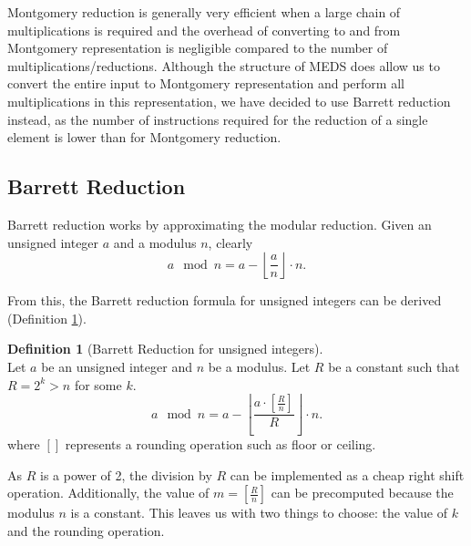 \documentclass[11pt,a4paper]{report}
\theoremstyle{definition}
\newtheorem{definition}{Definition}[section]
\begin{document}
Montgomery reduction is generally very efficient when a large chain of multiplications is required and the overhead of converting to and from Montgomery representation is negligible compared to the number of multiplications/reductions. Although the structure of MEDS does allow us to convert the entire input to Montgomery representation and perform all multiplications in this representation, we have decided to use Barrett reduction instead, as the number of instructions required for the reduction of a single element is lower than for Montgomery reduction.

\subsection{Barrett Reduction}
\label{sec:barrettreduction}
Barrett reduction works by approximating the modular reduction. Given an unsigned integer $a$ and a modulus $n$, clearly
\[
  a \mod n = a - \left\lfloor \frac{a}{n} \right\rfloor \cdot n.
\]

From this, the Barrett reduction formula for unsigned integers can be derived (Definition \ref{def:barrettreduction}).

\begin{definition}[Barrett Reduction for unsigned integers]~\\
  \label{def:barrettreduction}
  Let $a$ be an unsigned integer and $n$ be a modulus.
  Let $R$ be a constant such that $R = 2^k > n$ for some $k$.
  \[
    a \mod n = a - \left\lfloor \frac{a \cdot \left[\frac{R}{n}\right]}{R} \right\rfloor \cdot n.
  \]
  where $\left[\right]$ represents a rounding operation such as floor or ceiling.
\end{definition}

As $R$ is a power of 2, the division by $R$ can be implemented as a cheap right shift operation. Additionally, the value of $m = \left[\frac{R}{n}\right]$ can be precomputed because the modulus $n$ is a constant. This leaves us with two things to choose: the value of $k$ and the rounding operation.
\end{document}

